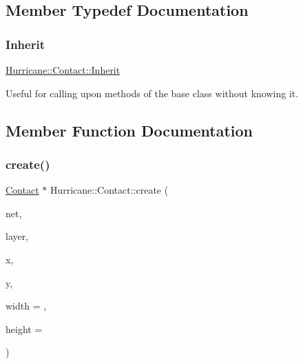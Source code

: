 \subsection{Member Typedef Documentation}
\mbox{\label{classHurricane_1_1Contact_a422f15bba0561d8499c001fb8cbe6b67}} 
\subsubsection{\texorpdfstring{Inherit}{Inherit}}
{\footnotesize\ttfamily \mbox{\hyperlink{classHurricane_1_1Contact_a422f15bba0561d8499c001fb8cbe6b67}{Hurricane\+::\+Contact\+::\+Inherit}}}

Useful for calling upon methods of the base class without knowing it. 

\subsection{Member Function Documentation}
\mbox{\label{classHurricane_1_1Contact_ab66989c2dce4d398f1f7647aca50d983}} 
\subsubsection{\texorpdfstring{create()}{create()}\hspace{0.1cm}{\footnotesize\ttfamily [1/2]}}
{\footnotesize\ttfamily \mbox{\hyperlink{classHurricane_1_1Contact}{Contact}} $\ast$ Hurricane\+::\+Contact\+::create (\begin{DoxyParamCaption}\item[{\mbox{\hyperlink{classHurricane_1_1Net}{Net}} $\ast$}]{net,  }\item[{const \mbox{\hyperlink{classHurricane_1_1Layer}{Layer}} $\ast$}]{layer,  }\item[{\mbox{\hyperlink{group__DbUGroup_ga4fbfa3e8c89347af76c9628ea06c4146}{Db\+U\+::\+Unit}}}]{x,  }\item[{\mbox{\hyperlink{group__DbUGroup_ga4fbfa3e8c89347af76c9628ea06c4146}{Db\+U\+::\+Unit}}}]{y,  }\item[{\mbox{\hyperlink{group__DbUGroup_ga4fbfa3e8c89347af76c9628ea06c4146}{Db\+U\+::\+Unit}}}]{width = {},  }\item[{\mbox{\hyperlink{group__DbUGroup_ga4fbfa3e8c89347af76c9628ea06c4146}{Db\+U\+::\+Unit}}}]{height = {} }\end{DoxyParamCaption})\hspace{0.3cm}{\ttfamily [static]}}

